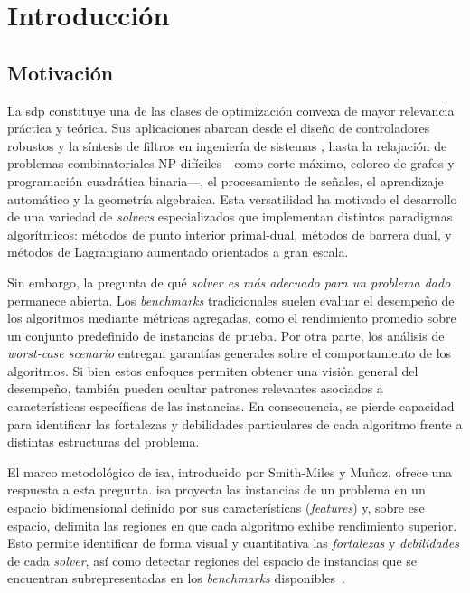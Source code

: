 \chapter{Introducción}
\label{ch:intro}


\section{Motivación} %

La \acrfull{sdp} constituye una de las clases de optimización convexa de mayor relevancia
práctica y teórica.
Sus aplicaciones abarcan desde el diseño de controladores robustos
\cite{faresROBUSTCONTROLSEQUENTIAL2002} y la síntesis de filtros
en ingeniería de sistemas \cite{liLinearMatrixInequality1997,wuFIRFilterDesign1996},
hasta la relajación de problemas combinatoriales NP-difíciles—como corte máximo,
coloreo de grafos y programación cuadrática binaria—,
el procesamiento de señales, el aprendizaje automático y la geometría algebraica.
Esta versatilidad ha motivado el desarrollo de una variedad de \textit{solvers} especializados que
implementan distintos paradigmas algorítmicos: métodos de punto interior primal-dual,
métodos de barrera dual, y métodos de Lagrangiano aumentado orientados a gran escala.

Sin embargo, la pregunta de qué \textit{solver es más adecuado para un problema dado}
permanece abierta.
Los \textit{benchmarks} tradicionales suelen evaluar el desempeño de los algoritmos mediante métricas
agregadas, como el rendimiento promedio sobre un conjunto predefinido de instancias de prueba.
Por otra parte, los análisis de \textit{worst-case scenario} entregan garantías generales
sobre el comportamiento de los algoritmos.
Si bien estos enfoques permiten obtener una visión general del desempeño, también pueden
ocultar patrones relevantes asociados a características específicas de las instancias.
En consecuencia, se pierde capacidad para identificar las fortalezas y debilidades
particulares de cada algoritmo frente a distintas estructuras del problema.

El marco metodológico de \acrfull{isa}, introducido por Smith-Miles y Muñoz, ofrece una
respuesta a esta pregunta.
\acrshort{isa} proyecta las instancias de un problema en un espacio bidimensional definido
por sus características (\textit{features}) y, sobre ese espacio, delimita las regiones en que
cada algoritmo exhibe rendimiento superior.
Esto permite identificar de forma visual y cuantitativa las \textit{fortalezas} y
\textit{debilidades} de cada \textit{solver}, así como detectar regiones del espacio de instancias
que se encuentran subrepresentadas en los \textit{benchmarks}
disponibles~\cite{smith-milesInstanceSpaceAnalysis2023}.

